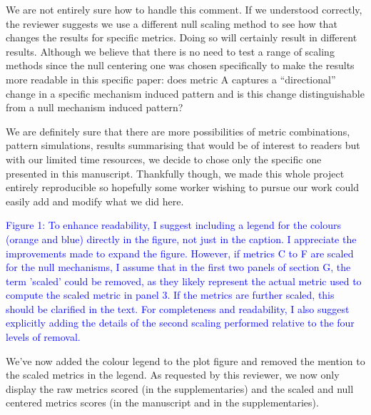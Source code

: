 \documentclass[
]{article}
\begin{document}
We are not entirely sure how to handle this comment.
If we understood correctly, the reviewer suggests we use a different null scaling method to see how that changes the results for specific metrics.
Doing so will certainly result in different results.
Although we believe that there is no need to test a range of scaling methods since the null centering one was chosen specifically to make the results more readable in this specific paper: does metric A captures a ``directional'' change in a specific mechanism induced pattern and is this change distinguishable from a null mechanism induced pattern?

We are definitely sure that there are more possibilities of metric combinations, pattern simulations, results summarising that would be of interest to readers but with our limited time resources, we decide to chose only the specific one presented in this manuscript.
Thankfully though, we made this whole project entirely reproducible so hopefully some worker wishing to pursue our work could easily add and modify what we did here.


\textcolor{blue}{Figure 1: To enhance readability, I suggest including a legend for the colours (orange and blue) directly in the figure, not just in the caption.
I appreciate the improvements made to expand the figure.
However, if metrics C to F are scaled for the null mechanisms, I assume that in the first two panels of section G, the term 'scaled' could be removed, as they likely represent the actual metric used to compute the scaled metric in panel 3.
If the metrics are further scaled, this should be clarified in the text.
For completeness and readability, I also suggest explicitly adding the details of the second scaling performed relative to the four levels of removal.}

We've now added the colour legend to the plot figure and removed the mention to the scaled metrics in the legend.
As requested by this reviewer, we now only display the raw metrics scored (in the supplementaries) and the scaled and null centered metrics scores (in the manuscript and in the supplementaries).
\end{document}
